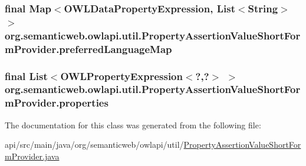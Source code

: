\hypertarget{classorg_1_1semanticweb_1_1owlapi_1_1util_1_1_property_assertion_value_short_form_provider_a0f8fae8460337c21d7b175c4fc5f07da}{
\subsubsection[{preferred\-Language\-Map}]{\setlength{\rightskip}{0pt plus 5cm}final Map$<${\bf O\-W\-L\-Data\-Property\-Expression}, List$<$String$>$ $>$ org.\-semanticweb.\-owlapi.\-util.\-Property\-Assertion\-Value\-Short\-Form\-Provider.\-preferred\-Language\-Map\hspace{0.3cm}{\ttfamily [private]}}}\label{classorg_1_1semanticweb_1_1owlapi_1_1util_1_1_property_assertion_value_short_form_provider_a0f8fae8460337c21d7b175c4fc5f07da}
\hypertarget{classorg_1_1semanticweb_1_1owlapi_1_1util_1_1_property_assertion_value_short_form_provider_a07edbe5f15f2554fd362a1bfb0cd183e}{
\subsubsection[{properties}]{\setlength{\rightskip}{0pt plus 5cm}final List$<$O\-W\-L\-Property\-Expression$<$?,?$>$ $>$ org.\-semanticweb.\-owlapi.\-util.\-Property\-Assertion\-Value\-Short\-Form\-Provider.\-properties\hspace{0.3cm}{\ttfamily [private]}}}\label{classorg_1_1semanticweb_1_1owlapi_1_1util_1_1_property_assertion_value_short_form_provider_a07edbe5f15f2554fd362a1bfb0cd183e}


The documentation for this class was generated from the following file\-:\begin{DoxyCompactItemize}
\item 
api/src/main/java/org/semanticweb/owlapi/util/\hyperlink{_property_assertion_value_short_form_provider_8java}{Property\-Assertion\-Value\-Short\-Form\-Provider.\-java}\end{DoxyCompactItemize}
